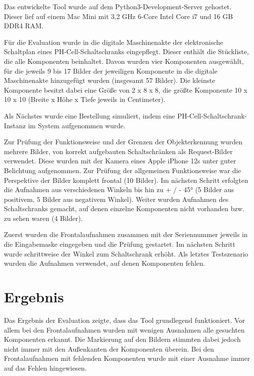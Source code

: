 \documentclass[
    type=Prakikumsbericht,
    status=draft, %
    language=german, %
    bibengine=bibtex,
]{unibwm-inf-thesis}
\begin{document}
    Das entwickelte Tool wurde auf dem Python3-Development-Server gehostet.
    Dieser lief auf einem Mac Mini mit 3,2 GHz 6-Core Intel Core i7 und 16 GB DDR4 RAM.

    Für die Evaluation wurde in die digitale Maschinenakte der elektronische Schaltplan eines PH-Cell-Schaltschranks eingepflegt.
    Dieser enthält die Stückliste, die alle Komponenten beinhaltet.
    Davon wurden vier Komponenten ausgewählt, für die jeweils 9 bis 17 Bilder der jeweiligen Komponente in die digitale Maschinenakte hinzugefügt wurden (insgesamt 57 Bilder).
    Die kleinste Komponente besitzt dabei eine Größe von 2 x 8 x 8, die größte Komponente 10 x 10 x 10 (Breite x Höhe x Tiefe jeweils in Centimeter).

    Als Nächstes wurde eine Bestellung simuliert, indem eine PH-Cell-Schaltschrank-Instanz im System aufgenommen wurde.

    Zur Prüfung der Funktionsweise und der Grenzen der Objekterkennung wurden mehrere Bilder, von korrekt aufgebauten Schaltschränken als Request-Bilder verwendet.
    Diese wurden mit der Kamera eines Apple iPhone 12s unter guter Belichtung aufgenommen.
    Zur Prüfung der allgemeinen Funktionsweise war die Perspektive der Bilder komplett frontal (10 Bilder).
    Im nächsten Schritt erfolgten die Aufnahmen aus verschiedenen Winkeln bis hin zu + / - 45° (5 Bilder aus positivem, 5 Bilder aus negativem Winkel).
    Weiter wurden Aufnahmen des Schaltschranks gemacht, auf denen einzelne Komponenten nicht vorhanden bzw. zu sehen waren (4 Bilder).

    Zuerst wurden die Frontalaufnahmen zusammen mit der Seriennummer jeweils in die Eingabemaske eingegeben und die Prüfung gestartet.
    Im nächsten Schritt wurde schrittweise der Winkel zum Schaltschrank erhöht.
    Als letztes Testszenario wurden die Aufnahmen verwendet, auf denen Komponenten fehlen.

    \section{Ergebnis}
    Das Ergebnis der Evaluation zeigte, dass das Tool grundlegend funktioniert.
    Vor allem bei den Frontalaufnahmen wurden mit wenigen Ausnahmen alle gesuchten Komponenten erkannt.
    Die Markierung auf den Bildern stimmten dabei jedoch nicht immer mit den Außenkanten der Komponenten überein.
    Bei den Frontalaufnahmen mit fehlenden Komponenten wurde mit einer Ausnahme immer auf das Fehlen hingewiesen.
\end{document}
